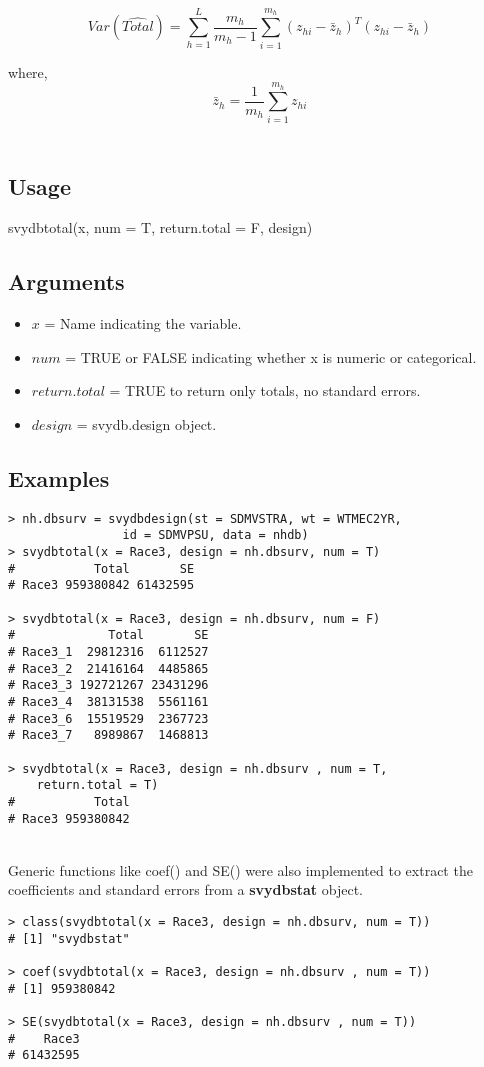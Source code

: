 $$Var(\hat{Total}) =  \sum_{h = 1}^{L} \frac{m_h}{m_h - 1} 
                    \sum_{i = 1}^{m_h} (z_{hi} - \bar{z}_h)^T (z_{hi} - \bar{z}_h)$$

where,
$$\bar{z}_h = \frac{1}{m_h} \sum_{i = 1}^{m_h} z_{hi}$$
\\
\subsection{Usage}
\begin{center}
    {\ttfamily svydbtotal(x, num = T, return.total = F, design)}
\end{center}
\subsection{Arguments}
\begin{itemize}
\item $x$ = Name indicating the variable.

\item $num$ = {\ttfamily TRUE} or {\ttfamily FALSE} indicating whether x is numeric or categorical.

\item $return.total$ = {\ttfamily TRUE} to return only totals, no standard errors.

\item $design$ = svydb.design object.
\end{itemize}

\newpage
\subsection{Examples}
\begin{lstlisting}
> nh.dbsurv = svydbdesign(st = SDMVSTRA, wt = WTMEC2YR, 
                id = SDMVPSU, data = nhdb)
> svydbtotal(x = Race3, design = nh.dbsurv, num = T)
#           Total       SE
# Race3 959380842 61432595

> svydbtotal(x = Race3, design = nh.dbsurv, num = F)
#             Total       SE
# Race3_1  29812316  6112527
# Race3_2  21416164  4485865
# Race3_3 192721267 23431296
# Race3_4  38131538  5561161
# Race3_6  15519529  2367723
# Race3_7   8989867  1468813

> svydbtotal(x = Race3, design = nh.dbsurv , num = T, 
    return.total = T)
#           Total
# Race3 959380842
\end{lstlisting}
\\

Generic functions like {\ttfamily coef()} and {\ttfamily SE()} were also implemented to extract the coefficients and standard errors from a {\bf svydbstat} object.
\begin{lstlisting}
> class(svydbtotal(x = Race3, design = nh.dbsurv, num = T))
# [1] "svydbstat"

> coef(svydbtotal(x = Race3, design = nh.dbsurv , num = T))
# [1] 959380842

> SE(svydbtotal(x = Race3, design = nh.dbsurv , num = T))
#    Race3 
# 61432595 
\end{lstlisting}
\\
